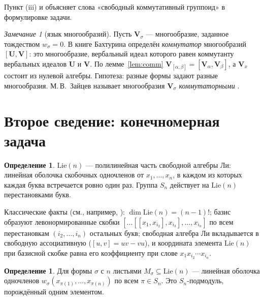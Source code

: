 \documentclass[11pt]{article}
\newcommand{\Lie}{\mathrm{Lie}}
\theoremstyle{plain}
\theoremstyle{definition}
\newtheorem{definition}[theorem]{Определение}
\theoremstyle{remark}
\newtheorem{remark}[theorem]{Замечание}
\begin{document}
Пункт (iii) и объясняет слова «свободный коммутативный группоид» в формулировке задачи.

\begin{remark}[язык многообразий]
Пусть $\mathbf V_\sigma$ --- многообразие, заданное тождеством $w_\sigma=0$. В книге Бахтурина \cite[п.~4.3.8]{Bah} определён \emph{коммутатор} многообразий $[\mathbf U,\mathbf V]$: это многообразие, вербальный идеал которого равен коммутанту вербальных идеалов $\mathbf U$ и $\mathbf V$. По лемме~\ref{lem:comm} $\mathbf V_{[\alpha,\beta]}=[\mathbf V_\alpha,\mathbf V_\beta]$, а $\mathbf V_x$ состоит из нулевой алгебры. Гипотеза: разные формы задают разные многообразия. М.\,В.~Зайцев называет многообразия $\mathbf V_\sigma$ \emph{коммутаторными} \cite{Z98}.
\end{remark}

\section{Второе сведение: конечномерная задача}\label{sec:finite}

\begin{definition}
$\Lie(n)$ --- полилинейная часть свободной алгебры Ли: линейная оболочка скобочных одночленов от $x_1,\dots,x_n$, в каждом из которых каждая буква встречается ровно один раз. Группа $S_n$ действует на $\Lie(n)$ перестановками букв.
\end{definition}

Классические факты (см., например, \cite{Reu}): $\dim\Lie(n)=(n-1)!$; базис образуют левонормированные скобки $[\dots[[x_1,x_{i_2}],x_{i_3}],\dots,x_{i_n}]$ по всем перестановкам $(i_2,\dots,i_n)$ остальных букв; свободная алгебра Ли вкладывается в свободную ассоциативную ($[u,v]=uv-vu$), и координата элемента $\Lie(n)$ при базисной скобке равна его коэффициенту при слове $x_1x_{i_2}\cdots x_{i_n}$.

\begin{definition}
Для формы $\sigma$ с $n$ листьями $M_\sigma\subseteq\Lie(n)$ --- линейная оболочка одночленов $w_\sigma(x_{\pi(1)},\dots,x_{\pi(n)})$ по всем $\pi\in S_n$. Это $S_n$-подмодуль, порождённый одним элементом.
\end{definition}
\end{document}
